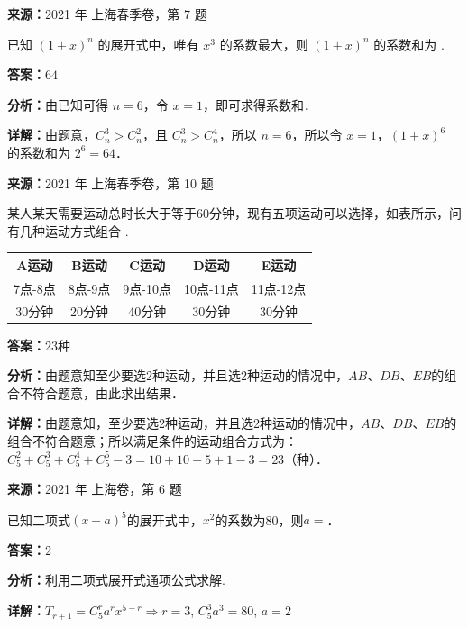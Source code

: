 \begin{question}[points=5]
\textbf{来源：}2021 年 上海春季卷，第 7 题\par
已知 $(1+x)^n$ 的展开式中，唯有 $x^3$ 的系数最大，则 $(1+x)^n$ 的系数和为  .
\fillin[{$64$}]
\begin{solution}
\textbf{答案：}$64$

\textbf{分析：}由已知可得 $n=6$，令 $x=1$，即可求得系数和．

\textbf{详解：}由题意，$C_n^3>C_n^2$，且 $C_n^3>C_n^4$，所以 $n=6$，所以令 $x=1$，$(1+x)^6$ 的系数和为 $2^6=64$．
\end{solution}
\end{question}

\begin{question}[points=5]
\textbf{来源：}2021 年 上海春季卷，第 10 题\par
某人某天需要运动总时长大于等于60分钟，现有五项运动可以选择，如表所示，问有几种运动方式组合  .\begin{center}\begin{tabular}{|c|c|c|c|c|} \hline A运动 & B运动 & C运动 & D运动 & E运动 \\ \hline 7点-8点 & 8点-9点 & 9点-10点 & 10点-11点 & 11点-12点 \\ \hline 30分钟 & 20分钟 & 40分钟 & 30分钟 & 30分钟 \\ \hline \end{tabular}\end{center}
\fillin[{$23$种}]
\begin{solution}
\textbf{答案：}$23$种

\textbf{分析：}由题意知至少要选2种运动，并且选2种运动的情况中，$AB$、$DB$、$EB$的组合不符合题意，由此求出结果．

\textbf{详解：}由题意知，至少要选2种运动，并且选2种运动的情况中，$AB$、$DB$、$EB$的组合不符合题意；所以满足条件的运动组合方式为：$C_5^2+C_5^3+C_5^4+C_5^5-3=10+10+5+1-3=23$（种）．
\end{solution}
\end{question}

\begin{question}[points=4]
\textbf{来源：}2021 年 上海卷，第 6 题\par
已知二项式$(x+a)^5$的展开式中，$x^2$的系数为80，则$a=$．
\fillin[{$2$}]
\begin{solution}
\textbf{答案：}$2$

\textbf{分析：}利用二项式展开式通项公式求解.

\textbf{详解：}$T_{r+1}=C_5^r a^r x^{5-r}\Rightarrow r=3$, $C_5^3a^3=80$, $a=2$
\end{solution}
\end{question}

